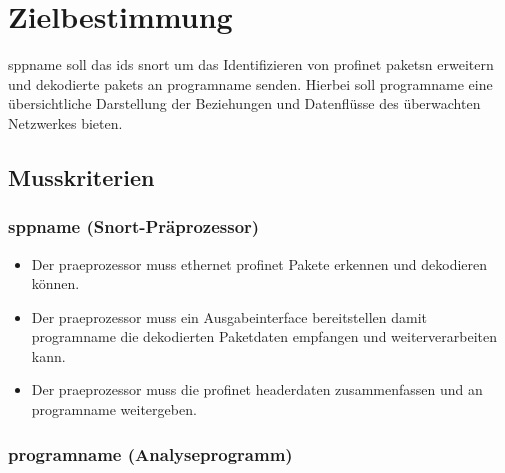 \chapter{Zielbestimmung}

\gls{sppname} soll das \gls{ids} \gls{snort} um das Identifizieren von \gls{profinet} \glspl{paket}n erweitern und dekodierte \glspl{paket} an \gls{programname} senden. Hierbei soll \gls{programname} eine übersichtliche Darstellung der Beziehungen und Datenflüsse des überwachten Netzwerkes bieten.

\section{Musskriterien}

\subsection{\gls{sppname} (Snort-Präprozessor)}

\begin{itemize}
\item Der \gls{praeprozessor} muss \gls{ethernet} \gls{profinet} Pakete erkennen und dekodieren können.

\item Der \gls{praeprozessor} muss ein Ausgabeinterface bereitstellen damit \gls{programname} die dekodierten Paketdaten empfangen und weiterverarbeiten kann.

\item Der \gls{praeprozessor} muss die \gls{profinet} \gls{headerdaten} zusammenfassen und an \gls{programname} weitergeben.
\end{itemize}

\subsection{\gls{programname} (Analyseprogramm)}


